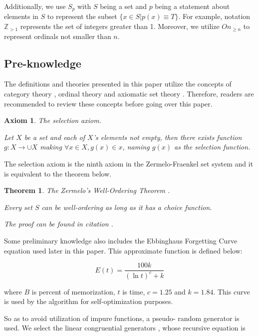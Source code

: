 \documentclass{aims}
\numberwithin{equation}{section}
\newtheorem{theorem}{Theorem}	%
\newtheorem{axiom}{Axiom}	%
\numberwithin{theorem}{section}	%
\numberwithin{axiom}{section}	%
\numberwithin{definition}{section}	%
\begin{document}
	Additionally, we use \(S_p\) with \(S\) being a set and \(p\) being a statement about elements in \(S\) to represent the subset \(\{x\in S|p(x)\equiv T\}\). For example, notation \(\mathbb{Z}_{>1}\) represents the set of integers greater than 1. Moreover, we utilize \(On_{\geq n}\) to represent ordinals not smaller than \(n\).
	
	\subsection{Pre-knowledge}
	
	The definitions and theories presented in this paper utilize the concepts of category theory \cite{Li2019}, ordinal theory \cite{Li2019} and axiomatic set theory \cite{Li2019}. Therefore, readers are recommended to review these concepts before going over this paper.
	
	\begin{axiom}
		The selection axiom.
		
		Let \(X\) be a set and each of \(X\){'}s elements not empty, then there exists function \(g:X\to \cup X\) making \(\forall x\in X,g(x)\in x\), naming \(g(x)\) as the selection function.
	\end{axiom}
	
	The selection axiom is the ninth axiom in the Zermelo-Fraenkel set system and it is equivalent to the theorem below.
	
	\begin{theorem}
		The Zermelo{'}s Well-Ordering Theorem \cite{Li2019}.
		
		Every set \(S\) can be well-ordering as long as it has a choice function.
		
		The proof can be found in citation \cite{Li2019}.
	\end{theorem}
	
	Some preliminary knowledge also includes the Ebbinghaus Forgetting Curve equation \cite{Ebbinghaus1913} used later in this paper. This approximate function is defined below:
	
	\begin{equation*}
		E(\mathit{t})=\frac{100 k}{(\ln  t)^c+k}
	\end{equation*}
	
	\noindent where \(B\) is percent of memorization, \(t\) is time, \(c=1.25\) and \(k=1.84\). This curve is used by the algorithm for self-optimization purposes.
	
	So as to avoid utilization of impure functions, a pseudo- random generator is used. We select the linear congruential generators \cite{Entacher1997}, whose recursive equation is
	
\end{document}
